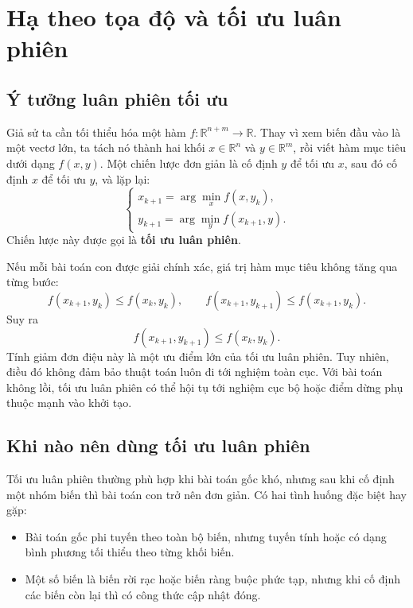 
\section{Hạ theo tọa độ và tối ưu luân phiên}
\label{SEC_coordinate_alternation}

\subsection{Ý tưởng luân phiên tối ưu}
\label{SUB_SEC_alternation_idea}
Giả sử ta cần tối thiểu hóa một hàm $f:\mathbb{R}^{n+m}\rightarrow\mathbb{R}$. Thay vì xem biến đầu vào là một vectơ lớn, ta tách nó thành hai khối $x\in\mathbb{R}^{n}$ và $y\in\mathbb{R}^{m}$, rồi viết hàm mục tiêu dưới dạng $f(x,y)$. Một chiến lược đơn giản là cố định $y$ để tối ưu $x$, sau đó cố định $x$ để tối ưu $y$, và lặp lại:
\begin{equation}
    \begin{cases}
        x_{k+1}=\arg\min_x f(x,y_k),\\
        y_{k+1}=\arg\min_y f(x_{k+1},y).
    \end{cases}
    \label{eq_alternation_two_blocks}
\end{equation}
Chiến lược này được gọi là \textbf{tối ưu luân phiên}.
\medskip

Nếu mỗi bài toán con được giải chính xác, giá trị hàm mục tiêu không tăng qua từng bước:
\begin{equation}
    f(x_{k+1},y_k)\leq f(x_k,y_k),
    \qquad
    f(x_{k+1},y_{k+1})\leq f(x_{k+1},y_k).
    \label{eq_alternation_monotone}
\end{equation}
Suy ra
\begin{equation}
    f(x_{k+1},y_{k+1})\leq f(x_k,y_k).
    \label{eq_alternation_energy_decrease}
\end{equation}
Tính giảm đơn điệu này là một ưu điểm lớn của tối ưu luân phiên. Tuy nhiên, điều đó không đảm bảo thuật toán luôn đi tới nghiệm toàn cục. Với bài toán không lồi, tối ưu luân phiên có thể hội tụ tới nghiệm cục bộ hoặc điểm dừng phụ thuộc mạnh vào khởi tạo.

\subsection{Khi nào nên dùng tối ưu luân phiên}
\label{SUB_SEC_when_alternation}
Tối ưu luân phiên thường phù hợp khi bài toán gốc khó, nhưng sau khi cố định một nhóm biến thì bài toán con trở nên đơn giản. Có hai tình huống đặc biệt hay gặp:
\begin{itemize}
    \item Bài toán gốc phi tuyến theo toàn bộ biến, nhưng tuyến tính hoặc có dạng bình phương tối thiểu theo từng khối biến.
    \item Một số biến là biến rời rạc hoặc biến ràng buộc phức tạp, nhưng khi cố định các biến còn lại thì có công thức cập nhật đóng.
\end{itemize}
\medskip

